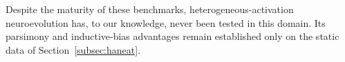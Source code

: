 Despite the maturity of these benchmarks, heterogeneous-activation neuroevolution has, to our knowledge, never been tested in this domain. Its parsimony and inductive-bias advantages remain established only on the static data of Section~\ref{subsec:haneat}.




